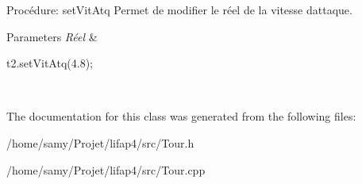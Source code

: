 Procédure\+: set\+Vit\+Atq Permet de modifier le réel de la vitesse d\textquotesingle{}attaque. 


\begin{DoxyParams}{Parameters}
{\em Réel} & 
\begin{DoxyCode}
t2.setVitAtq(4.8);
\end{DoxyCode}
 \\
\hline
\end{DoxyParams}


The documentation for this class was generated from the following files\+:\begin{DoxyCompactItemize}
\item 
/home/samy/\+Projet/lifap4/src/Tour.\+h\item 
/home/samy/\+Projet/lifap4/src/Tour.\+cpp\end{DoxyCompactItemize}
